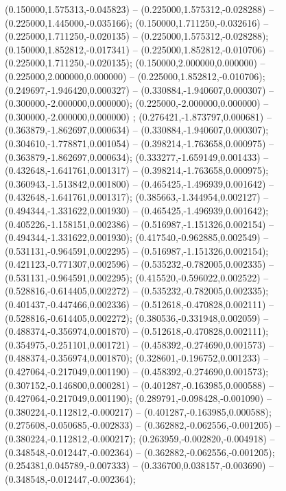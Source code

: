  (0.150000,1.575313,-0.045823) -- (0.225000,1.575312,-0.028288) -- (0.225000,1.445000,-0.035166);
 (0.150000,1.711250,-0.032616) -- (0.225000,1.711250,-0.020135) -- (0.225000,1.575312,-0.028288);
 (0.150000,1.852812,-0.017341) -- (0.225000,1.852812,-0.010706) -- (0.225000,1.711250,-0.020135);
 (0.150000,2.000000,0.000000) -- (0.225000,2.000000,0.000000) -- (0.225000,1.852812,-0.010706);
 (0.249697,-1.946420,0.000327) -- (0.330884,-1.940607,0.000307) -- (0.300000,-2.000000,0.000000);
 (0.225000,-2.000000,0.000000) -- (0.300000,-2.000000,0.000000) ;
 (0.276421,-1.873797,0.000681) -- (0.363879,-1.862697,0.000634) -- (0.330884,-1.940607,0.000307);
 (0.304610,-1.778871,0.001054) -- (0.398214,-1.763658,0.000975) -- (0.363879,-1.862697,0.000634);
 (0.333277,-1.659149,0.001433) -- (0.432648,-1.641761,0.001317) -- (0.398214,-1.763658,0.000975);
 (0.360943,-1.513842,0.001800) -- (0.465425,-1.496939,0.001642) -- (0.432648,-1.641761,0.001317);
 (0.385663,-1.344954,0.002127) -- (0.494344,-1.331622,0.001930) -- (0.465425,-1.496939,0.001642);
 (0.405226,-1.158151,0.002386) -- (0.516987,-1.151326,0.002154) -- (0.494344,-1.331622,0.001930);
 (0.417540,-0.962885,0.002549) -- (0.531131,-0.964591,0.002295) -- (0.516987,-1.151326,0.002154);
 (0.421123,-0.771307,0.002596) -- (0.535232,-0.782005,0.002335) -- (0.531131,-0.964591,0.002295);
 (0.415520,-0.596022,0.002522) -- (0.528816,-0.614405,0.002272) -- (0.535232,-0.782005,0.002335);
 (0.401437,-0.447466,0.002336) -- (0.512618,-0.470828,0.002111) -- (0.528816,-0.614405,0.002272);
 (0.380536,-0.331948,0.002059) -- (0.488374,-0.356974,0.001870) -- (0.512618,-0.470828,0.002111);
 (0.354975,-0.251101,0.001721) -- (0.458392,-0.274690,0.001573) -- (0.488374,-0.356974,0.001870);
 (0.328601,-0.196752,0.001233) -- (0.427064,-0.217049,0.001190) -- (0.458392,-0.274690,0.001573);
 (0.307152,-0.146800,0.000281) -- (0.401287,-0.163985,0.000588) -- (0.427064,-0.217049,0.001190);
 (0.289791,-0.098428,-0.001090) -- (0.380224,-0.112812,-0.000217) -- (0.401287,-0.163985,0.000588);
 (0.275608,-0.050685,-0.002833) -- (0.362882,-0.062556,-0.001205) -- (0.380224,-0.112812,-0.000217);
 (0.263959,-0.002820,-0.004918) -- (0.348548,-0.012447,-0.002364) -- (0.362882,-0.062556,-0.001205);
 (0.254381,0.045789,-0.007333) -- (0.336700,0.038157,-0.003690) -- (0.348548,-0.012447,-0.002364);
